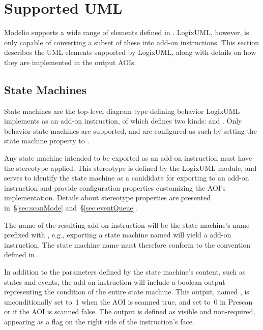 \section{Supported UML}

Modelio supports a wide range of elements defined in \textcite{OMGUML}.
LogixUML, however, is only capable of converting a subset of these into
add-on instructions. This section describes the UML elements supported
by LogixUML, along with details on how they are implemented in the output
AOIs.

\subsection{State Machines}

State machines are the top-level diagram type defining behavior
LogixUML implements as an add-on instruction, of which \textcite[\S14]{OMGUML}
defines two kinds: 
and . Only behavior state machines are
supported, and are configured as such by setting the state machine
 property to .

Any state machine intended to be exported as an add-on instruction
must have the \identifier{\stereotypeName} stereotype applied.
This stereotype is defined by the LogixUML module, and serves to
identify the state machine as a canididate for exporting to an add-on
instruction and provide configuration properties customizing the
AOI's implementation. Details about stereotype properties are presented
in~\S\ref{sec:scanMode} and~\S\ref{sec:eventQueue}.

The name of the resulting add-on instruction will be the state machine's
name prefixed with , e.g., exporting a state
machine named  will yield a
 add-on instruction.
The state machine name must therefore conform to the convention defined
in \textcite[Chapter~2]{AOI}.

In addition to the parameters defined by the state machine's content,
such as states and events, the add-on instruction will include a
boolean output representing the condition of the entire state machine.
This output, named , is unconditionally set to~1 when
the AOI is scanned true, and set to~0 in Prescan or if the AOI
is scanned false. The  output is defined as visible
and non-required, appearing as a flag on the right side of the
instruction's face.

